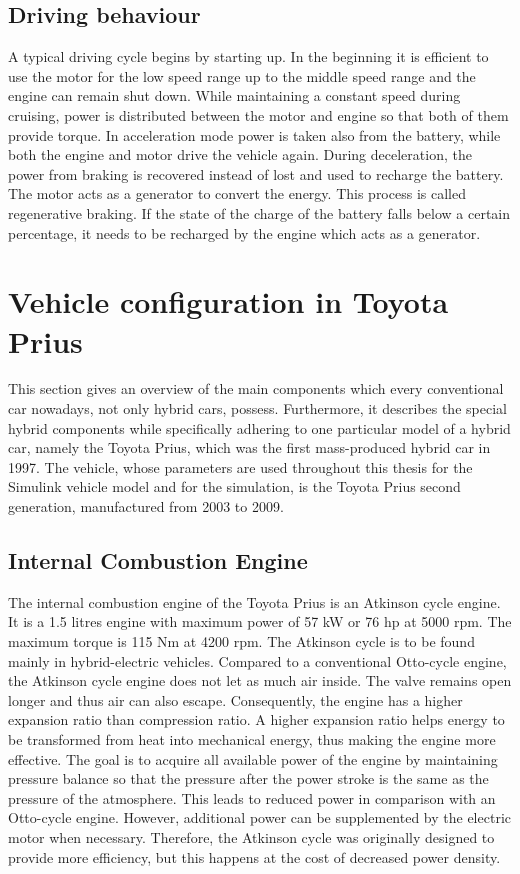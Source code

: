 \subsection{Driving behaviour}
A typical driving cycle begins by starting up. In the beginning it is efficient to use the motor for the low speed range up to the middle speed range and the engine can remain shut down. While maintaining a constant speed during cruising, power is distributed between the motor and engine so that both of them provide torque. In acceleration mode power is taken also from the battery, while both the engine and motor drive the vehicle again. During deceleration, the power from braking is recovered instead of lost and used to recharge the battery. The motor acts as a generator to convert the energy. This process is called regenerative braking. If the state of the charge of the battery falls below a certain percentage, it needs to be recharged by the engine which acts as a generator.

\section{Vehicle configuration in Toyota Prius}
This section gives an overview of the main components which every conventional car nowadays, not only hybrid cars, possess. Furthermore, it describes the special hybrid components while specifically adhering to one particular model of a hybrid car, namely the Toyota Prius, which was the first mass-produced hybrid car in 1997. The vehicle, whose parameters are used throughout this thesis for the Simulink vehicle model and for the simulation, is the Toyota Prius second generation, manufactured from 2003 to 2009.

\subsection{Internal Combustion Engine}
The internal combustion engine of the Toyota Prius is an Atkinson cycle engine. It is a 1.5 litres engine with maximum power of 57 kW or 76 hp at 5000 rpm. The maximum torque is 115 Nm at 4200 rpm. The Atkinson cycle is to be found mainly in hybrid-electric vehicles. Compared to a conventional Otto-cycle engine, the Atkinson cycle engine does not let as much air inside. The valve remains open longer and thus air can also escape. Consequently, the engine has a higher expansion ratio than compression ratio. A higher expansion ratio helps energy to be transformed from heat into mechanical energy, thus making the engine more effective. The goal is to acquire all available power of the engine by maintaining pressure balance so that the pressure after the power stroke is the same as the pressure of the atmosphere. This leads to reduced power in comparison with an Otto-cycle engine. However, additional power can be supplemented by the electric motor when necessary. Therefore, the Atkinson cycle was originally designed to provide more efficiency, but this happens at the cost of decreased power density. 

